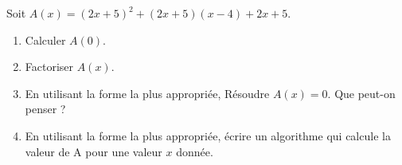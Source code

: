 
Soit $A(x)=\left( 2x+5\right)^2 + \left( 2x+5\right)\left(x-4\right) + 2x+5$.
\begin{enumerate}
\item Calculer $A(0)$.
\item Factoriser $A(x)$.
\item En utilisant la forme la plus appropriée, Résoudre $A(x)=0$. Que peut-on penser ?
\item En utilisant la forme la plus appropriée, écrire un algorithme qui calcule la valeur de A pour une valeur $x$ donnée.
\end{enumerate}